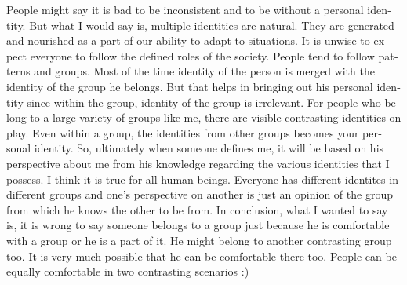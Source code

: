 \begin{english}
People might say it is bad to be inconsistent and to be without a personal identity. But what I would say is, 
multiple identities are natural. They are generated and nourished as a part of our ability to adapt to situations. 
It is unwise to expect everyone to follow the defined roles of the society. People tend to follow patterns and 
groups. Most of the time identity of the person is merged with the identity of the group he belongs. But that 
helps in bringing out his personal identity since within the group, identity of the group is irrelevant. For people 
who belong to a large variety of groups like me, there are visible contrasting identities on play. Even within a 
group, the identities from other groups becomes your personal identity. So, ultimately when someone defines me, 
it will be based on his perspective about me from his knowledge regarding the various identities that I possess. 
I think it is true for all human beings. Everyone has different identites in different groups and one's perspective on 
another is just an opinion of the group from which he knows the other to be from. In conclusion, what I wanted to 
say is, it is wrong to say someone belongs to a group just because he is comfortable with a group or he is a 
part of it. He might belong to another contrasting group too. It is very much possible that he can be comfortable 
there too. People can be equally comfortable in two contrasting scenarios :)
\end{english}
\newpage 
